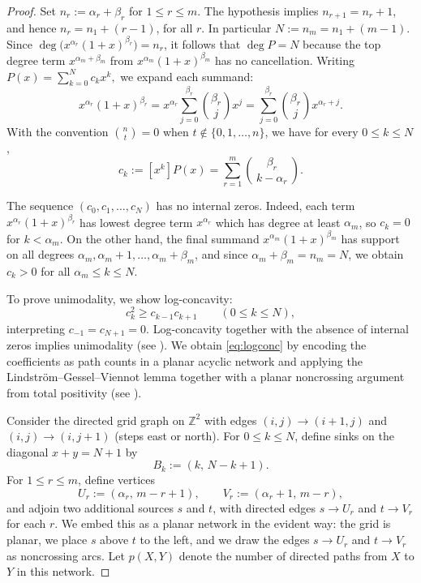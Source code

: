 \documentclass[11pt]{amsart}
\numberwithin{equation}{section}
\begin{document}
\begin{proof}
Set $n_r := \alpha_r+\beta_r$ for $1 \leq r \leq m$. The hypothesis implies $n_{r+1}=n_r+1$, and hence $n_r=n_1+(r-1)$, for all $r$. In particular $N:=n_m=n_1+(m-1).$ Since $\deg\bigl(x^{\alpha_r}(1+x)^{\beta_r}\bigr)=n_r$, it follows that $\deg P = N$ because the top degree term $x^{\alpha_m+\beta_m}$ from $x^{\alpha_m}(1+x)^{\beta_m}$ has no cancellation. Writing $P(x)=\sum_{k=0}^{N} c_k x^k,$ we expand each summand:
\[
x^{\alpha_r}(1+x)^{\beta_r}
= x^{\alpha_r}\sum_{j=0}^{\beta_r}\binom{\beta_r}{j}x^j
= \sum_{j=0}^{\beta_r}\binom{\beta_r}{j}x^{\alpha_r+j}.
\]
With the convention $\binom{n}{t}=0$ when $t\notin\{0,1,\dots,n\}$, we have for every $0\le k\le N$,
\begin{equation}\label{eq:ck-sum}
c_k := [x^k]P(x)= \sum_{r=1}^m \binom{\beta_r}{\,k-\alpha_r\,}.
\end{equation}

The sequence $(c_0,c_1,\dots,c_N)$ has no internal zeros. Indeed, each term $x^{\alpha_r}(1+x)^{\beta_r}$ has lowest degree term $x^{\alpha_r}$ which has degree at least $\alpha_m$, so $c_k=0$ for $k<\alpha_m$. On the other hand, the final summand $x^{\alpha_m}(1+x)^{\beta_m}$ has support on all degrees $\alpha_m,\alpha_m+1,\dots,\alpha_m+\beta_m$, and since $\alpha_m+\beta_m=n_m=N$, we obtain $c_k>0$ for all $\alpha_m\le k\le N$.

To prove unimodality, we show log-concavity:
\begin{equation}\label{eq:logconc}
c_k^2 \ge c_{k-1}c_{k+1}\qquad (0\le k\le N),
\end{equation}
interpreting $c_{-1}=c_{N+1}=0$. Log-concavity together with the absence of internal zeros implies unimodality (see \cite{Stanley1989}). We obtain \eqref{eq:logconc} by encoding the coefficients as path counts in a planar acyclic network and applying the Lindstr\"om--Gessel--Viennot lemma \cite{GesselViennot1985,Lindstrom1973} together with a planar noncrossing argument from total positivity (see \cite{Postnikov2006}).

Consider the directed grid graph on $\mathbb{Z}^2$ with edges $(i,j)\to(i+1,j)$ and $(i,j)\to(i,j+1)$ (steps east or north). For $0\le k\le N$, define sinks on the diagonal $x+y=N+1$ by
\[
B_k := (k,\,N-k+1).
\]
For $1\le r\le m$, define vertices
\[
U_r := (\alpha_r,\,m-r+1),
\qquad
V_r := (\alpha_r+1,\,m-r),
\]
and adjoin two additional sources $s$ and $t$, with directed edges $s\to U_r$ and $t\to V_r$ for each $r$. We embed this as a planar network in the evident way: the grid is planar, we place $s$ above $t$ to the left, and we draw the edges $s\to U_r$ and $t\to V_r$ as noncrossing arcs. Let $p(X,Y)$ denote the number of directed paths from $X$ to $Y$ in this network.


\end{proof}
\end{document}
